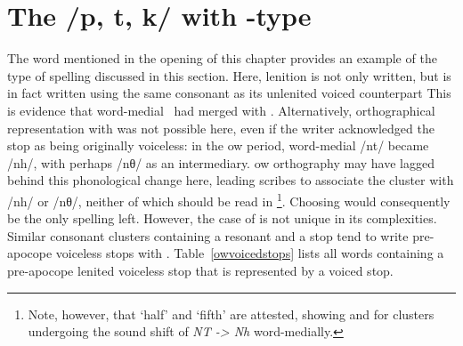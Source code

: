 \section{The /p, t, k/ with -type}
\label{ptkwithbdg}
The word  mentioned in the opening of this chapter provides an example of the type of spelling discussed in this section. Here, lenition is not only written, but is in fact written using the same consonant as its unlenited voiced counterpart  This is evidence that word-medial \xT\ had merged with \xD.  Alternatively, orthographical representation with  was not possible here, even if the writer acknowledged the stop as being originally voiceless: in the \gls{ow} period, word-medial /nt/ became /nh/, with perhaps /nθ/ as an intermediary. \Gls{ow} orthography may have lagged behind this phonological change here, leading scribes to associate the cluster  with /nh/ or /nθ/, neither of which should be read in \footnote{Note, however, that  `half' and  `fifth' are attested, showing  and  for clusters undergoing the sound shift of \textit{NT -> Nh} word-medially.}. Choosing  would consequently be the only spelling left. However, the case of  is not unique in its complexities. Similar consonant clusters containing a resonant and a stop tend to write pre-apocope voiceless stops with . Table~\ref{owvoicedstops} lists all words containing a pre-apocope lenited voiceless stop that is represented by a voiced stop.

